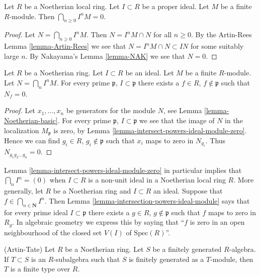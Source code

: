\begin{lemma}
\label{lemma-intersect-powers-ideal-module-zero}
Let $R$ be a Noetherian local ring. Let $I \subset R$ be
a proper ideal. Let $M$ be a finite $R$-module.
Then $\bigcap_{n \geq 0} I^nM = 0$.
\end{lemma}

\begin{proof}
Let $N = \bigcap_{n \geq 0} I^nM$.
Then $N = I^nM \cap N$ for all $n \geq 0$.
By the Artin-Rees Lemma \ref{lemma-Artin-Rees}
we see that $N = I^nM \cap N \subset IN$ for
some suitably large $n$. By Nakayama's Lemma \ref{lemma-NAK}
we see that $N = 0$.
\end{proof}

\begin{lemma}
\label{lemma-intersection-powers-ideal-module}
Let $R$ be a Noetherian ring.
Let $I \subset R$ be an ideal.
Let $M$ be a finite $R$-module.
Let $N = \bigcap_n I^n M$.
For every prime $\mathfrak p$,
$I \subset \mathfrak p$ there
exists a $f \in R$, $f \not \in \mathfrak p$
such that $N_f = 0$.
\end{lemma}

\begin{proof}
Let $x_1, \ldots, x_n$ be generators for the module $N$,
see Lemma \ref{lemma-Noetherian-basic}. For every prime
$\mathfrak p$, $I \subset \mathfrak p$ we see that
the image of $N$ in the localization $M_{\mathfrak p}$
is zero, by Lemma \ref{lemma-intersect-powers-ideal-module-zero}.
Hence we can find $g_i \in R$, $g_i \not \in \mathfrak p$
such that $x_i$ maps to zero in $N_{g_i}$. Thus
$N_{g_1g_2\ldots g_n} = 0$.
\end{proof}

\begin{remark}
\label{remark-intersection-powers-ideal}
Lemma \ref{lemma-intersect-powers-ideal-module-zero}
in particular implies that $\bigcap_n I^n = (0)$
when $I \subset R$ is a non-unit ideal in a Noetherian
local ring $R$. More generally, let $R$ be a Noetherian ring and
$I \subset R$ an ideal. Suppose that $f \in \bigcap_{n \in \mathbf{N}} I^n$.
Then Lemma \ref{lemma-intersection-powers-ideal-module}
says that for every prime ideal $I \subset \mathfrak p$
there exists a $g \in R$, $g \not \in \mathfrak p$
such that $f$ maps to zero in $R_g$. In algebraic geometry we
express this by saying that ``$f$ is zero in an open neighbourhood
of the closed set $V(I)$ of $\text{Spec}(R)$''.
\end{remark}

\begin{lemma}
\label{lemma-Artin-Tate}
(Artin-Tate) Let $R$ be a Noetherian ring. Let $S$ be a finitely
generated $R$-algebra. If $T \subset S$ is an $R$-subalgebra such
that $S$ is finitely generated as a $T$-module, then $T$ is a
finite type over $R$.
\end{lemma}

